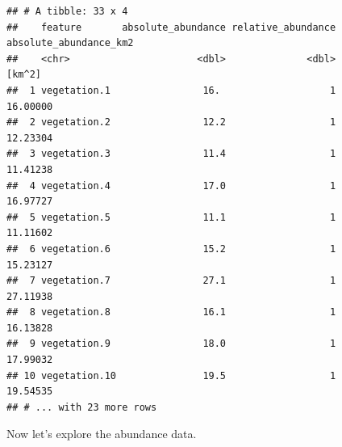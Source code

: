 \documentclass[12pt,]{book}
\newenvironment{Shaded}{\begin{snugshade}}{\end{snugshade}}
\newcommand{\KeywordTok}[1]{\textcolor[rgb]{0.13,0.29,0.53}{\textbf{#1}}}
\newcommand{\DecValTok}[1]{\textcolor[rgb]{0.00,0.00,0.81}{#1}}
\newcommand{\StringTok}[1]{\textcolor[rgb]{0.31,0.60,0.02}{#1}}
\newcommand{\CommentTok}[1]{\textcolor[rgb]{0.56,0.35,0.01}{\textit{#1}}}
\newcommand{\OperatorTok}[1]{\textcolor[rgb]{0.81,0.36,0.00}{\textbf{#1}}}
\newcommand{\NormalTok}[1]{#1}
\begin{document}
\begin{Shaded}
\end{Shaded}

\begin{verbatim}
## # A tibble: 33 x 4
##    feature       absolute_abundance relative_abundance absolute_abundance_km2
##    <chr>                      <dbl>              <dbl>                 [km^2]
##  1 vegetation.1                16.                   1               16.00000
##  2 vegetation.2                12.2                  1               12.23304
##  3 vegetation.3                11.4                  1               11.41238
##  4 vegetation.4                17.0                  1               16.97727
##  5 vegetation.5                11.1                  1               11.11602
##  6 vegetation.6                15.2                  1               15.23127
##  7 vegetation.7                27.1                  1               27.11938
##  8 vegetation.8                16.1                  1               16.13828
##  9 vegetation.9                18.0                  1               17.99032
## 10 vegetation.10               19.5                  1               19.54535
## # ... with 23 more rows
\end{verbatim}

Now let's explore the abundance data.

\begin{Shaded}
\end{Shaded}
\end{document}
